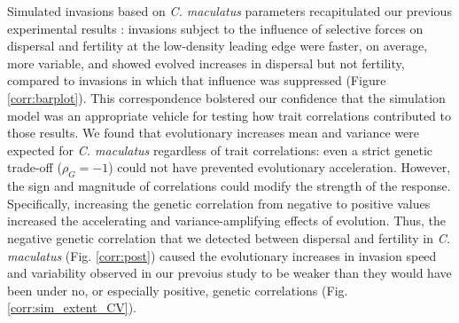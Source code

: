\documentclass[11pt]{article}
\newcommand{\revise}[1]{{\color{Mahogany}{#1}}}
\begin{document}
Simulated invasions based on \textit{C. maculatus} parameters recapitulated our previous experimental results \citep{ochocki_rapid_2017}: invasions subject to the influence of selective forces on dispersal and fertility at the low-density leading edge were faster, on average, more variable, and showed evolved increases in dispersal but not fertility, compared to invasions in which that influence was suppressed (Figure \ref{corr:barplot}).
This correspondence bolstered our confidence that the simulation model was an appropriate vehicle for testing how trait correlations contributed to those results.
We found that evolutionary increases \revise{in} mean and variance were expected for \textit{C. maculatus} regardless of trait correlations: even a strict genetic trade-off ($\rho_{G} = -1$) could not have prevented evolutionary acceleration.
However, the sign and magnitude of correlations could modify the strength of the response.
Specifically, increasing the genetic correlation from negative to positive values increased the accelerating and variance-amplifying effects of evolution.
Thus, the negative genetic correlation that we detected between dispersal and fertility in \textit{C. maculatus} (Fig. \ref{corr:post}) caused the evolutionary increases in invasion speed and variability observed in our prevoius study to be weaker than they would have been under no, or especially positive, genetic correlations (Fig. \ref{corr:sim_extent_CV}).
\end{document}
